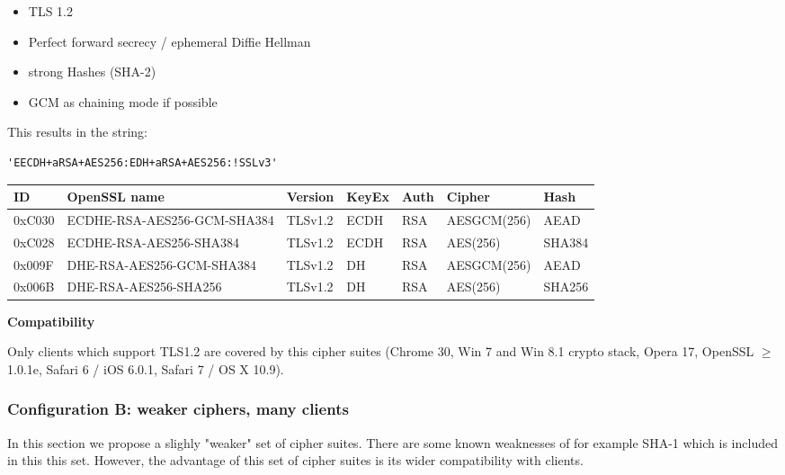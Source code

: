 \begin{itemize}
\item TLS 1.2
\item Perfect forward secrecy / ephemeral Diffie Hellman
\item strong Hashes (SHA-2)
\item GCM as chaining mode if possible 
\end{itemize}

This results in the string:

\begin{lstlisting}[breaklines]
'EECDH+aRSA+AES256:EDH+aRSA+AES256:!SSLv3'
\end{lstlisting}

%



\begin{center}
\begin{tabular}{| l | l | l | l | l| l | l |}
\hline
ID        & OpenSSL name                & Version & KeyEx & Auth & Cipher & Hash \\ \hline
0xC030 & ECDHE-RSA-AES256-GCM-SHA384 & TLSv1.2 & ECDH  &  RSA &AESGCM(256)  & AEAD   \\ \hline
0xC028 & ECDHE-RSA-AES256-SHA384     & TLSv1.2 & ECDH  &  RSA &AES(256)     & SHA384 \\ \hline
0x009F & DHE-RSA-AES256-GCM-SHA384   & TLSv1.2 & DH    &  RSA &AESGCM(256)  & AEAD   \\ \hline
0x006B & DHE-RSA-AES256-SHA256       & TLSv1.2 & DH    &  RSA &AES(256)     & SHA256 \\ \hline
\end{tabular}
\end{center}


\textbf{Compatibility}

Only clients which support TLS1.2 are covered by this cipher suites (Chrome 30,
Win 7 and Win 8.1 crypto stack, Opera 17, OpenSSL $\ge$ 1.0.1e, Safari 6 / iOS
6.0.1, Safari 7 / OS X 10.9).



\subsubsection{Configuration B: weaker ciphers, many clients}

In this section we propose a slighly "weaker" set of cipher suites. There are
some known weaknesses of for example SHA-1 which is included in this this set.
However, the advantage of this set of cipher suites is its wider compatibility
with clients. 


